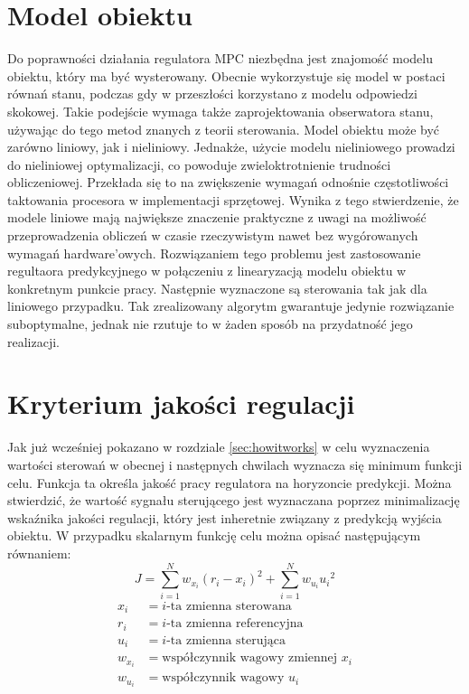 \section{Model obiektu} \label{sec:model}
Do poprawności działania regulatora MPC niezbędna jest znajomość modelu obiektu, który ma być wysterowany.
Obecnie wykorzystuje się model w postaci równań stanu, podczas gdy w przeszłości korzystano z modelu
odpowiedzi skokowej. Takie podejście wymaga także zaprojektowania obserwatora stanu, używając do tego
metod znanych z teorii sterowania. Model obiektu może być zarówno liniowy, jak i nieliniowy. Jednakże,
użycie modelu nieliniowego prowadzi do nieliniowej optymalizacji, co powoduje zwieloktrotnienie trudności
obliczeniowej. Przekłada się to na zwiększenie wymagań odnośnie częstotliwości taktowania procesora
w implementacji sprzętowej. Wynika z tego stwierdzenie, że modele liniowe mają największe znaczenie
praktyczne z uwagi na możliwość przeprowadzenia obliczeń w czasie rzeczywistym nawet bez wygórowanych
wymagań hardware'owych. Rozwiązaniem tego problemu jest zastosowanie regultaora predykcyjnego w połączeniu
z linearyzacją modelu obiektu w konkretnym punkcie pracy. Następnie wyznaczone są sterowania tak jak dla
liniowego przypadku. Tak zrealizowany algorytm gwarantuje jedynie rozwiązanie suboptymalne, jednak nie
rzutuje to w żaden sposób na przydatność jego realizacji.

\section{Kryterium jakości regulacji} \label{sec:quality}
Jak już wcześniej pokazano w rozdziale \ref{sec:howitworks} w celu wyznaczenia wartości sterowań
w obecnej i następnych chwilach wyznacza się minimum funkcji celu. Funkcja ta określa jakość pracy
regulatora na horyzoncie predykcji. Można stwierdzić, że wartość sygnału sterującego jest wyznaczana
poprzez minimalizację wskaźnika jakości regulacji, który jest inheretnie związany z predykcją wyjścia
obiektu.
\newline W przypadku skalarnym funkcję celu można opisać następującym równaniem:
\begin{equation}
    J=\sum _{i=1}^{N}w_{x_{i}}(r_{i}-x_{i})^{2}+\sum _{i=1}^{N}w_{u_{i}}{u_{i}}^{2}
\label{eq:quality}
\end{equation}
\begin{align*}
    x_{i} &= i\text{-ta zmienna sterowana}\\
    r_{i} &= i\text{-ta zmienna referencyjna}\\
    u_{i} &= i\text{-ta zmienna sterująca}\\
    w_{x_{i}} &= \text{współczynnik wagowy zmiennej }x_{i}\\
    w_{u_{i}} &= \text{współczynnik wagowy }u_{i}
\end{align*}

